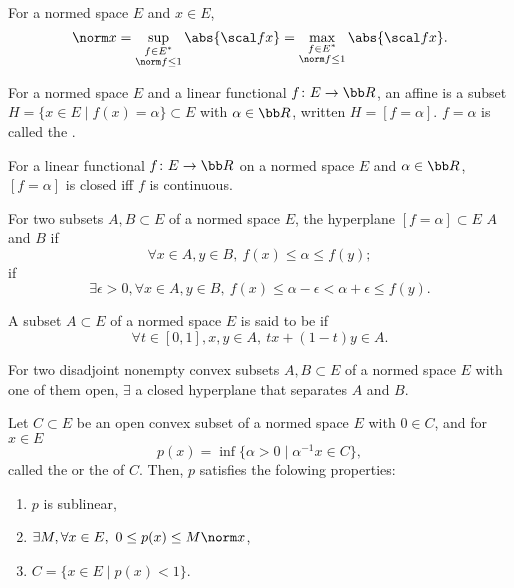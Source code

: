 For a normed space $E$ and $x \in E$,
\[
  \norm x = \sup_{\substack{f \in E^* \\ \norm f \le 1}} \abs{\scal fx} = \max_{\substack{f \in E^* \\ \norm f \le 1}} \abs{\scal fx}.
\]

For a normed space $E$ and a linear functional $f \colon E \to \bb R$, an affine  is a subset $H = \{ x \in E \mid f(x) = \alpha \} \subset E$ with $\alpha \in \bb R$, written $H = [f = \alpha]$. $f = \alpha$ is called the .

For a linear functional $f \colon E \to \bb R$ on a normed space $E$ and $\alpha \in \bb R$, $[f = \alpha]$ is closed iff $f$ is continuous.

For two subsets $A, B \subset E$ of a normed space $E$, the hyperplane $[f = \alpha] \subset E$  $A$ and $B$ if
\[
  \forall x \in A, y \in B,\ f(x) \le \alpha \le f(y);
\]
 if
\[
  \exists \epsilon > 0, \forall x \in A, y \in B,\ f(x) \le \alpha - \epsilon < \alpha + \epsilon \le f(y).
\]

A subset $A \subset E$ of a normed space $E$ is said to be  if
\[
  \forall t \in [0, 1], x, y \in A,\ tx + (1-t)y \in A.
\]

For two disadjoint nonempty convex subsets $A, B \subset E$ of a normed space $E$ with one of them open, $\exists$ a closed hyperplane that separates $A$ and $B$.

Let $C \subset E$ be an open convex subset of a normed space $E$ with $0 \in C$, and for $x \in E$
\[
  p(x) = \inf \{ \alpha > 0 \mid \alpha^{-1} x \in C \},
\]
called the  or the  of $C$.
Then, $p$ satisfies the folowing properties:
\begin{enumerate}
\item $p$ is sublinear,
\item $\exists M, \forall x \in E,\ 0 \le p(x) \le M \norm x$,
\item $C = \{ x \in E \mid p(x) < 1\}$.
\end{enumerate}


